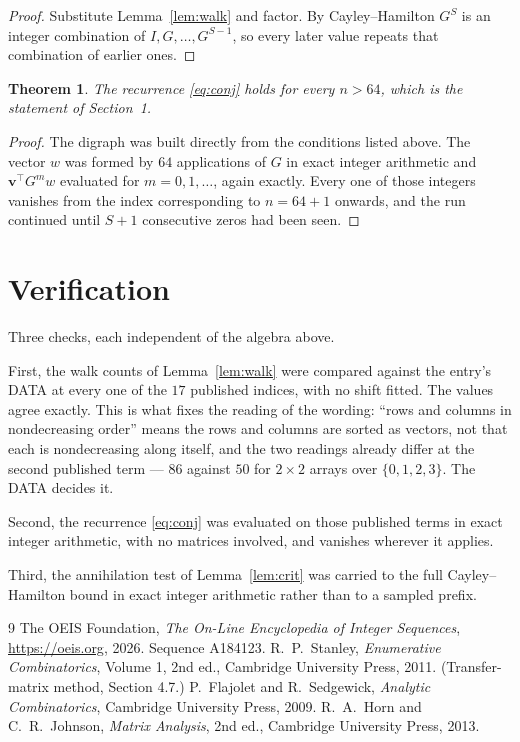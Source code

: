 \documentclass[11pt,a4paper]{article}
\theoremstyle{plain}
\newtheorem{theorem}{Theorem}
\theoremstyle{definition}
\begin{document}
\begin{proof}
Substitute Lemma~\ref{lem:walk} and factor. By Cayley--Hamilton $G^{S}$ is an integer
combination of $I,G,\dots,G^{S-1}$, so every later value repeats that combination of
earlier ones.
\end{proof}

\begin{theorem}
The recurrence \eqref{eq:conj} holds for every $n>64$, which is the statement of
Section~1.
\end{theorem}

\begin{proof}
The digraph was built directly from the conditions listed above. The vector $w$ was formed by
$64$ applications of $G$ in exact integer arithmetic and $\mathbf{v}^{\!\top}G^{m}w$
evaluated for $m=0,1,\dots$, again exactly. Every one of those integers vanishes from the
index corresponding to $n=64+1$ onwards, and the run continued until $S+1$ consecutive
zeros had been seen.
\end{proof}

\section{Verification}

Three checks, each independent of the algebra above.

First, the walk counts of Lemma~\ref{lem:walk} were compared against the entry's DATA at
every one of the $17$ published indices, with no shift fitted. The values agree exactly.
This is what fixes the reading of the wording: ``rows and columns in nondecreasing order''
means the rows and columns are sorted as vectors, not that each is nondecreasing along
itself, and the two readings already differ at the second published term --- $86$ against
$50$ for $2\times2$ arrays over $\{0,1,2,3\}$. The DATA decides it.

Second, the recurrence \eqref{eq:conj} was evaluated on those published terms in exact
integer arithmetic, with no matrices involved, and vanishes wherever it applies.

Third, the annihilation test of Lemma~\ref{lem:crit} was carried to the full
Cayley--Hamilton bound in exact integer arithmetic rather than to a sampled prefix.

\begin{thebibliography}{9}
 The OEIS Foundation, \emph{The On-Line Encyclopedia of Integer
Sequences}, \url{https://oeis.org}, 2026. Sequence A184123.
 R.~P.~Stanley, \emph{Enumerative Combinatorics}, Volume 1, 2nd ed.,
Cambridge University Press, 2011. (Transfer-matrix method, Section 4.7.)
 P.~Flajolet and R.~Sedgewick, \emph{Analytic Combinatorics}, Cambridge
University Press, 2009.
 R.~A.~Horn and C.~R.~Johnson, \emph{Matrix Analysis}, 2nd ed., Cambridge
University Press, 2013.
\end{thebibliography}
\end{document}
